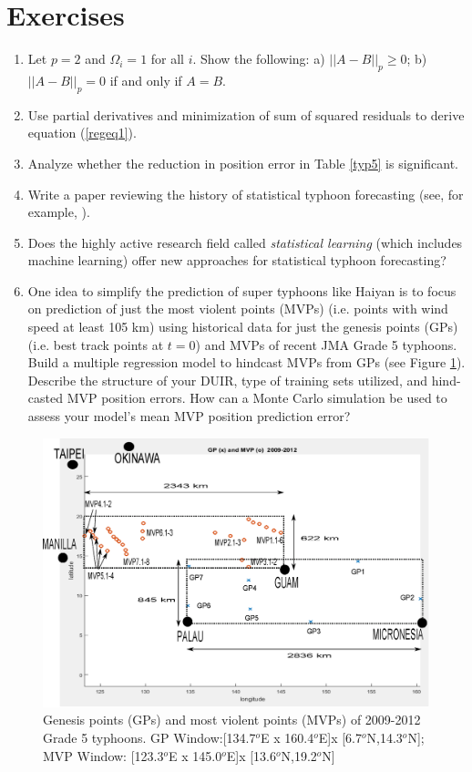 \documentclass{SBCbookchapter}
\begin{document}
\section{Exercises}

 \begin{enumerate}
\item Let $p=2$ and $\Omega_i=1$ for all $i$. Show the following: a) $||A-B||_p \ge 0$;  b)  $||A-B||_p = 0$ if and only if $A=B$.
 \item Use partial derivatives and minimization of sum of squared residuals to derive equation (\ref{regeq1}).
 \item Analyze whether the reduction in position error in Table \ref{typ5} is significant.
     \item Write a paper reviewing the history of statistical typhoon forecasting  (see, for example, \cite{Arakawa}).
\item  Does the highly active research field called \emph{statistical learning} (which includes machine learning) offer new approaches for statistical typhoon forecasting?
\item One idea to simplify the prediction of super typhoons like Haiyan is to focus on prediction of just the most violent points (MVPs) (i.e. points with wind speed at least 105 km)  using historical data for just the genesis points (GPs) (i.e. best track points at $t=0$) and MVPs of recent JMA Grade 5 typhoons. Build a multiple regression model to hindcast MVPs from GPs (see Figure \ref{GPMVP}). Describe the structure of your DUIR, type of training sets utilized, and hind-casted MVP position errors. How can a Monte Carlo simulation be used to assess your model's mean MVP position prediction error?
\end{enumerate}

\begin{figure}[!htpb]
 \centering
\includegraphics[width=5.in,height=3.in]{violentfig3.eps}
\caption{Genesis points (GPs) and most violent points (MVPs) of 2009-2012 Grade 5 typhoons. GP Window:[134.7$^o$E x 160.4$^o$E]x [6.7$^o$N,14.3$^o$N]; MVP Window: [123.3$^o$E x 145.0$^o$E]x [13.6$^o$N,19.2$^o$N]}
\label{GPMVP}
\end{figure}
\end{document}
